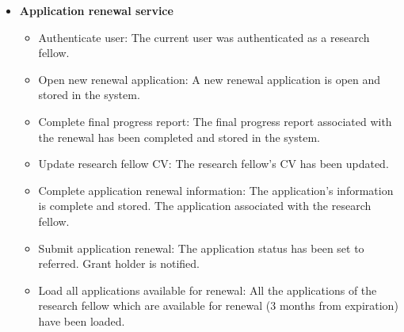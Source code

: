 \documentclass[12pt]{article}
\begin{document}
\begin{itemize}
	\item \textbf{Application renewal service}
		\begin{itemize}
			\item Authenticate user: The current user was authenticated as a research fellow.
			\item Open new renewal application: A new renewal application is open and stored in the system.
			\item Complete final progress report: The final progress report associated with	the renewal has been completed and stored in the system.
			\item Update research fellow CV: The research fellow's CV has been updated.
			\item Complete application renewal information: The application's information is complete and stored. The application associated with the research fellow.		
			\item Submit application renewal: The application status has been set to referred. Grant holder is notified.
			\item Load all applications available for renewal: All the applications of the research fellow which are available for renewal (3 months from expiration) have been loaded.											
		\end{itemize}
	

\end{itemize}
\end{document}
